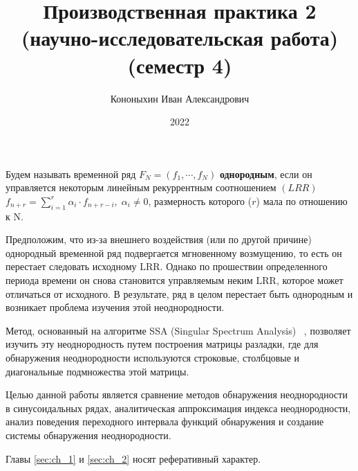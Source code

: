 \documentclass[specialist, substylefile = spbu.rtx,
			   subf, href, 12pt]{disser}
\begin{document}

\title{Производственная практика 2 (научно-исследовательская работа) (семестр 4)}


\author{Кононыхин Иван Александрович}


\date{2022}

\maketitle



\newpage
\tableofcontents
\newpage

\intro
Будем называть временной ряд $F_N = (f_1, \cdots, f_{N})$ \textbf{однородным}, если он управляется некоторым линейным рекуррентным соотношением $(LRR)$ $f_{n+r} = \sum_{i=1}^{r} \alpha_i\cdot f_{n+r-i}, \; \alpha_i \neq 0$, размерность которого ($r$) мала по отношению к $\mathrm{N}$. 

Предположим, что из-за внешнего воздействия (или по другой причине) однородный временной ряд подвергается мгновенному возмущению, то есть он перестает следовать исходному $\mathrm{LRR}$. Однако по прошествии определенного периода времени он снова становится управляемым неким $\mathrm{LRR}$, которое может отличаться от исходного. В результате, ряд в целом перестает быть однородным и возникает проблема изучения этой неоднородности.

Метод, основанный на алгоритме SSA (Singular Spectrum Analysis) ~\cite{Golyandina2001, Moskvina2010ChangeP}, позволяет изучить эту неоднородность путем построения матрицы разладки, где для обнаружения неоднородности используются строковые, столбцовые и диагональные подмножества этой матрицы.

Целью данной работы является сравнение методов обнаружения неоднородности в синусоидальных рядах, аналитическая аппроксимация индекса неоднородности, анализ поведения переходного интервала функций обнаружения и создание системы обнаружения неоднородности.

Главы \ref{sec:ch_1} и \ref{sec:ch_2} носят реферативный характер.
\end{document}
